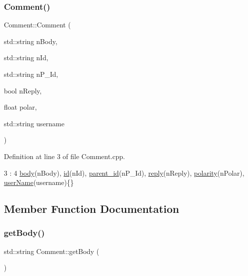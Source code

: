 \subsubsection{\texorpdfstring{Comment()}{Comment()}}
{\footnotesize\ttfamily Comment\+::\+Comment (\begin{DoxyParamCaption}\item[{std\+::string}]{n\+Body,  }\item[{std\+::string}]{n\+Id,  }\item[{std\+::string}]{n\+P\+\_\+\+Id,  }\item[{bool}]{n\+Reply,  }\item[{float}]{polar,  }\item[{std\+::string}]{username }\end{DoxyParamCaption})}



Definition at line 3 of file Comment.\+cpp.


\begin{DoxyCode}
3                                                                                                            
         : 
4     \hyperlink{class_comment_af8df10ee9d38440d5c4d500ccc9f2519}{body}(nBody), \hyperlink{class_comment_a63db6067036146247c4ab7f663d90369}{id}(nId), \hyperlink{class_comment_abc88c0f64df05cb3d29ad1c7aa1621c5}{parent\_id}(nP\_Id), \hyperlink{class_comment_a7b8ceeb67364d5e08299baeeff38ba03}{reply}(nReply), 
      \hyperlink{class_comment_a617b67425b39c1f5f1eb0ada3d4bbd74}{polarity}(nPolar), \hyperlink{class_comment_ad477f53e20e76aa9352926f93ccc7a56}{userName}(username)\{\}
\end{DoxyCode}


\subsection{Member Function Documentation}
\mbox{\label{class_comment_acd202bf4ef1b23aa8a11cae4af4b44b4}} 
\subsubsection{\texorpdfstring{get\+Body()}{getBody()}}
{\footnotesize\ttfamily std\+::string Comment\+::get\+Body (\begin{DoxyParamCaption}{ }\end{DoxyParamCaption})}




